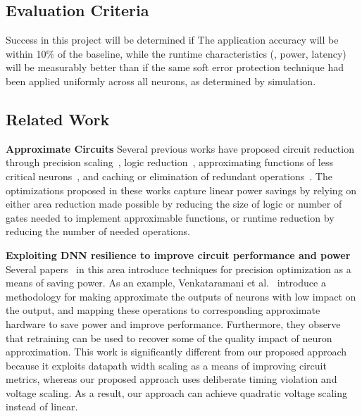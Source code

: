 
\subsection{Evaluation Criteria}

Success in this project will be determined if The application accuracy will be within 10\% of the baseline, while the runtime characteristics (\ie, power, latency) will be measurably better than if the same soft error protection technique had been applied uniformly across all neurons, as determined by simulation.

\subsection{Related Work}

\textbf{Approximate Circuits}
Several previous works have proposed circuit reduction through precision scaling~\cite{venkataramani2013quality}, logic reduction~\cite{gupta2011impact, chippa2014storm, esmaeilzadeh2012neural}, approximating functions of less critical neurons~\cite{zhang2015approxann, venkataramani2014axnn, moons2016energy}, and caching or elimination of redundant operations~\cite{yasoubi2017power, han2015learning, misailovic2014chisel}.
The optimizations proposed in these works capture linear power savings by relying on either area reduction made possible by reducing the size of logic or number of gates needed to implement approximable functions, or runtime reduction by reducing the number of needed operations.

\textbf{Exploiting DNN resilience to improve circuit performance and power} Several papers~\cite{moons2016energy, kung2015power, moons2017dvafs} in this area introduce techniques for precision optimization as a means of saving power.
As an example, Venkataramani et al.~\cite{venkataramani2014axnn} introduce a methodology for making approximate the outputs of neurons with low impact on the output, and mapping these operations to corresponding approximate hardware to save power and improve performance.
Furthermore, they observe that retraining can be used to recover some of the quality impact of neuron approximation.
This work is significantly different from our proposed approach because it exploits datapath width scaling as a means of improving circuit metrics, whereas our proposed approach uses deliberate timing violation and voltage scaling.
As a result, our approach can achieve quadratic voltage scaling instead of linear.

